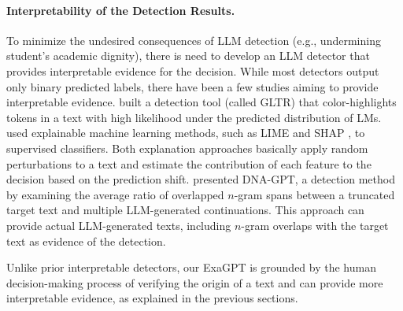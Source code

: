 \paragraph{Interpretability of the Detection Results.}
\label{interpretable_detectors}
To minimize the undesired consequences of LLM detection (e.g., undermining student's academic dignity), there is need to develop an LLM detector that provides interpretable evidence for the decision. 
While most detectors output only binary predicted labels, there have been a few studies aiming to provide interpretable evidence.
\citet{gehrmann2019gltr} built a detection tool (called GLTR) that color-highlights tokens in a text with high likelihood under the predicted distribution of LMs. 
\citet{mitrović2023chatgpt,wang-etal-2024-m4} used explainable machine learning methods, such as LIME \cite{lime16} and SHAP \cite{shap17}, to supervised classifiers. Both explanation approaches basically apply random perturbations to a text and estimate the contribution of each feature to the decision based on the prediction shift. 
\citet{yang2023dnagptdivergentngramanalysis} presented DNA-GPT, a detection method by examining the average ratio of overlapped $n$-gram spans between a truncated target text and multiple LLM-generated continuations.
This approach can provide actual LLM-generated texts, including $n$-gram overlaps with the target text as evidence of the detection.

Unlike prior interpretable detectors, our ExaGPT is grounded by the human decision-making process \cite{maurer06,barron-cedeno-etal-2013-plagiarism} of verifying the origin of a text and can provide more interpretable evidence, as explained in the previous sections.


